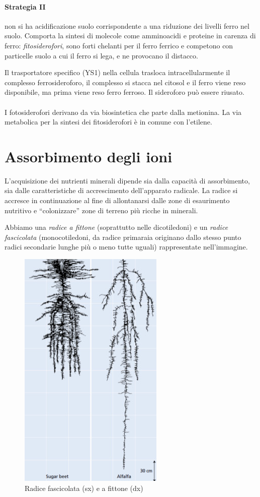 \documentclass[a4paper,12pt]{book}
\begin{document}
\paragraph{Strategia II} non si ha acidificazione suolo corrispondente a una riduzione dei livelli ferro nel suolo. Comporta la sintesi di molecole come amminoacidi e proteine in carenza di ferro: \emph{fitosiderofori}, sono forti chelanti per il ferro ferrico e competono con particelle suolo a cui il ferro si lega, e ne provocano il distacco.
 
Il trasportatore specifico  (YS1) nella cellula  trasloca intracellularmente il complesso ferrosideroforo, il complesso si stacca nel citosol e il ferro viene reso disponibile, ma prima viene reso ferro ferroso. Il sideroforo può essere riusato. 

\paragraph{}

I fotosiderofori derivano da via biosintetica che parte dalla metionina. La via metabolica per la sintesi dei  fitosiderofori è in comune con l'etilene. 

\section{Assorbimento degli ioni}
L'acquisizione dei nutrienti minerali dipende sia dalla capacità di assorbimento, sia
dalle caratteristiche di accrescimento dell'apparato radicale.
La radice si accresce in continuazione al fine di
allontanarsi dalle zone di esaurimento nutritivo e
“colonizzare” zone di terreno più ricche in minerali.

Abbiamo una \emph{radice a fittone} (soprattutto nelle dicotiledoni) e un \emph{radice fascicolata} (monocotiledoni, da radice primaraia originano dallo stesso punto radici secondarie lunghe più o meno tutte uguali) rappresentate nell'immagine. 
\begin{figure}[H]
\centering
\includegraphics[scale=0.4]{immagini/fittone.jpg}
\caption{Radice fascicolata (sx) e a fittone (dx)}
\end{figure}
\end{document}
